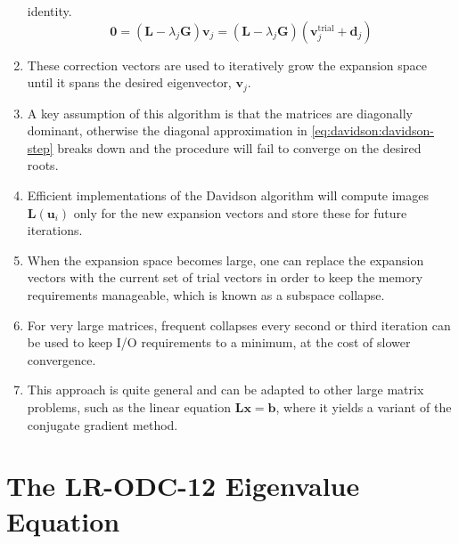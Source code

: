 \begin{enumerate}
        identity.
        \begin{equation}
            \mathbf{0}
            =
            (\mathbf{L} - \lambda_j\mathbf{G})
            \mathbf{v}_j
            =
            (\mathbf{L} - \lambda_j\mathbf{G})
            (
                \mathbf{v}_j^\mathrm{trial}
                +
                \mathbf{d}_j
            )
        \end{equation}
    \item
        These correction vectors are used to iteratively grow the expansion
        space until it spans the desired eigenvector, \(\mathbf{v}_j\).
    \item
        A key assumption of this algorithm is that the matrices are diagonally
        dominant, otherwise the diagonal approximation in
        \cref{eq:davidson:davidson-step} breaks down and the procedure will
        fail to converge on the desired roots.
    \item
        Efficient implementations of the Davidson algorithm will compute images
        \(\mathbf{L}(\mathbf{u}_i)\) only for the new expansion vectors and
        store these for future iterations.
    \item
        When the expansion space becomes large, one can replace the expansion
        vectors with the current set of trial vectors in order to keep the
        memory requirements manageable, which is known as a subspace collapse.
    \item
        For very large matrices, frequent collapses every second or third
        iteration can be used to keep I/O requirements to a minimum, at the cost
        of slower convergence.\cite{Leininger:2001p1574}
    \item
        This approach is quite general and can be adapted to other large matrix
        problems, such as the linear equation
        \(\mathbf{L}\mathbf{x}=\mathbf{b}\), where it yields a variant of the
        conjugate gradient method.
\end{enumerate}


\section{The LR-ODC-12 Eigenvalue Equation}
\label{sec:davidson:eig}

